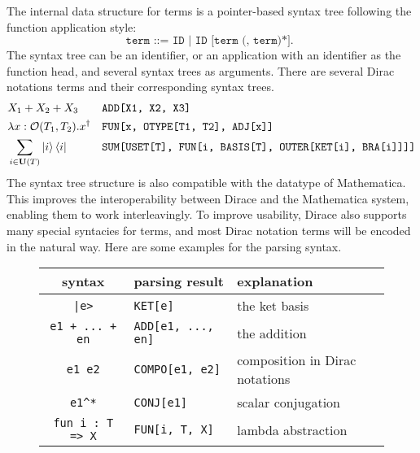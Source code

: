 \documentclass[runningheads]{llncs}
\begin{document}
The internal data structure for terms is a pointer-based syntax tree following the function application style:
\[
    \texttt{
        term ::= ID | ID [term (, term)*].
    }
\]
The syntax tree can be an identifier, or an application with an identifier as the function head, and several syntax trees as arguments. There are several Dirac notations terms and their corresponding syntax trees.
\footnotesize{
\begin{align*}
    & X_1 + X_2 + X_3 && \texttt{ADD[X1, X2, X3]} 
    \\
    & \lambda x: \mathcal{O}(T_1,  T_2). x^\dagger && \texttt{FUN[x, OTYPE[T1, T2], ADJ[x]]}
    \\
    & \sum_{i \in \mathbf{U}(T)} \ket{i} \bra{i} && \texttt{SUM[USET[T], FUN[i, BASIS[T], OUTER[KET[i], BRA[i]]]]}
\end{align*}
}
The syntax tree structure is also compatible with the datatype of Mathematica. This improves the interoperability between Dirace and the Mathematica system, enabling them to work interleavingly.
To improve usability, Dirace also supports many special syntacies for terms,  and most Dirac notation terms will be encoded in the natural way.
Here are some examples for the parsing syntax.

\begin{figure}
    \center
\begin{tabular}{c >{\centering\arraybackslash}p{4cm} l}
    \hline
    syntax & parsing result & explanation \\
    \hline
    \texttt{|e>} & \texttt{KET[e]} & the ket basis\\
    \texttt{e1 + ... + en} & \texttt{ADD[e1, ..., en]} & the addition\\
    \texttt{e1\ e2} & \texttt{COMPO[e1, e2]} & composition in Dirac notations \\
    \texttt{e1\^{}*} & \texttt{CONJ[e1]} & scalar conjugation \\
    \texttt{fun i : T => X} & \texttt{FUN[i, T, X]} & lambda abstraction \\
    \hline
\end{tabular}
\end{figure}
\end{document}
